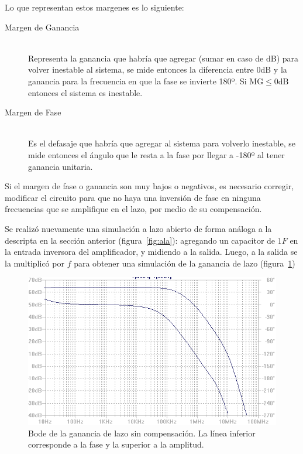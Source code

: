 \documentclass[a4paper,12pt,twoside]{article}
\begin{document}
Lo que representan estos margenes es lo siguiente:


\begin{description}
	\item[Margen de Ganancia] \hfill \\
		Representa la ganancia que habría que agregar (sumar en caso de dB) para volver inestable al sistema, se mide entonces la diferencia entre 0dB y la ganancia para la frecuencia en que la fase se invierte 180º. Si $\mathrm{MG} \le \mathrm{0dB}$ entonces el sistema es inestable.

	\item[Margen de Fase] \hfill \\
		Es el defasaje que habría que agregar al sistema para volverlo inestable, se mide entonces el ángulo que le resta a la fase por llegar a -180º al tener ganancia unitaria.
\end{description}

Si el margen de fase o ganancia son muy bajos o negativos, es necesario corregir, modificar el circuito para que no haya una inversión de fase en ninguna frecuencias que se amplifique en el lazo, por medio de su compensación.


Se realizó nuevamente una simulación a lazo abierto de forma análoga a la descripta en la sección anterior (figura~\ref{fig:ala}): agregando un capacitor de $1F$ en la entrada inversora del amplificador, y midiendo a la salida. Luego, a la salida se la multiplicó por $f$ para obtener una simulación de la ganancia de lazo (figura~\ref{fig:bode-la-sin-comp})

\begin{figure}[H]
	\centering
	\includegraphics[height=0.4\textwidth]{img/sim/bode-la-sin-comp}
	\caption{Bode de la ganancia de lazo sin compensación. La línea inferior corresponde a la fase y la superior a la amplitud.}
	\label{fig:bode-la-sin-comp}
\end{figure}
\end{document}
